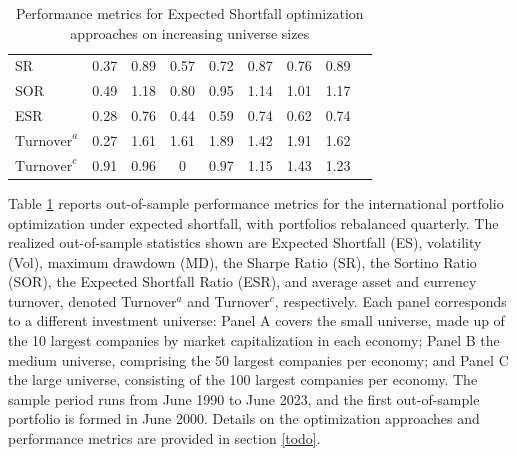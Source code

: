 \begin{table}
{\begin{tabular}{lcccccccc}
    SR                        & 0.37                    & 0.89                  & 0.57            & 0.72              & 0.87             & 0.76                & 0.89\\
    SOR                       & 0.49                    & 1.18                  & 0.80            & 0.95              & 1.14             & 1.01                & 1.17\\
    ESR                       & 0.28                    & 0.76                  & 0.44            & 0.59              & 0.74             & 0.62                & 0.74\\
    $\text{Turnover}^a$       & 0.27                    & 1.61                  & 1.61            & 1.89              & 1.42             & 1.91                & 1.62\\
    $\text{Turnover}^c$       & 0.91                    & 0.96                  & 0               & 0.97              & 1.15             & 1.43                & 1.23\\
    \bottomrule
  \end{tabular}%
}
  \caption{Performance metrics for Expected Shortfall optimization approaches on increasing universe sizes}
    \label{tab:es-universe-sizes}
   \vspace{0.5em}
  \begin{minipage}{\textwidth}  
  \raggedright\small
    Table \ref{tab:es-universe-sizes} reports out-of-sample performance metrics for the international
  portfolio optimization under expected shortfall, with portfolios rebalanced
  quarterly. The realized out-of-sample statistics shown are Expected Shortfall (ES), volatility (Vol),
  maximum drawdown (MD), the Sharpe Ratio (SR), the Sortino Ratio (SOR), the Expected Shortfall Ratio (ESR), 
  and average asset and currency turnover, denoted Turnover$^a$ and Turnover$^c$, respectively. 
  Each panel corresponds to a different investment universe:
  Panel A covers the small universe, made up of the 10 largest companies by market
  capitalization in each economy; Panel B the medium universe, comprising the 50 largest
  companies per economy; and Panel C the large universe, consisting of the 100 largest
  companies per economy. The sample period runs from June 1990 to June 2023, and the
  first out-of-sample portfolio is formed in June 2000. Details on the optimization approaches and 
    performance metrics are provided in section \ref{todo}.
  \end{minipage}
\end{table}

